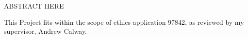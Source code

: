 \documentclass[ %
                author={Finn Alexander Wilkinson},
                supervisor={Dr. Andrew Calway},
                degree={MEng},
                title={\centering A Mixed Reality Aim Assistant for Pool and Snooker},
                subtitle={},
                type={Enterprise},
                year={2021} ]{dissertation}
\begin{document}



ABSTRACT HERE

This Project fits within the scope of ethics application 97842, as reviewed by my supervisor, Andrew Calway.
\end{document}
